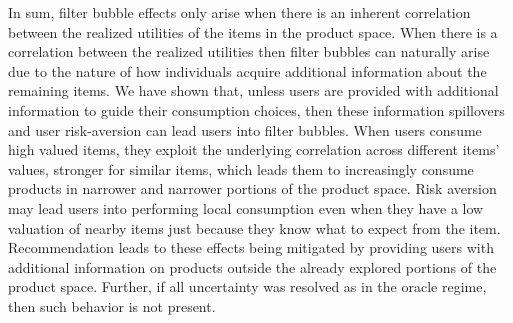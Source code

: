 \documentclass[manuscript]{acmart}
\begin{document}
In sum, filter bubble effects only arise when there is an inherent correlation between the realized utilities of the items in the product space. When there is a correlation between the realized utilities then filter bubbles can naturally arise due to the nature of how individuals acquire additional information about the remaining items. We have shown that, unless users are provided with additional information to guide their consumption choices, then these information spillovers and user risk-aversion can lead users into filter bubbles. When users consume high valued items, they exploit the underlying correlation across different items' values, stronger for similar items, which leads them to increasingly consume products in narrower and narrower portions of the product space. Risk aversion may lead users into performing local consumption even when they have a low valuation of nearby items just because they know what to expect from the item. Recommendation leads to these effects being mitigated by providing users with additional information on products outside the already explored portions of the product space. Further, if all uncertainty was resolved as in the oracle regime, then such behavior is not present.
\end{document}
